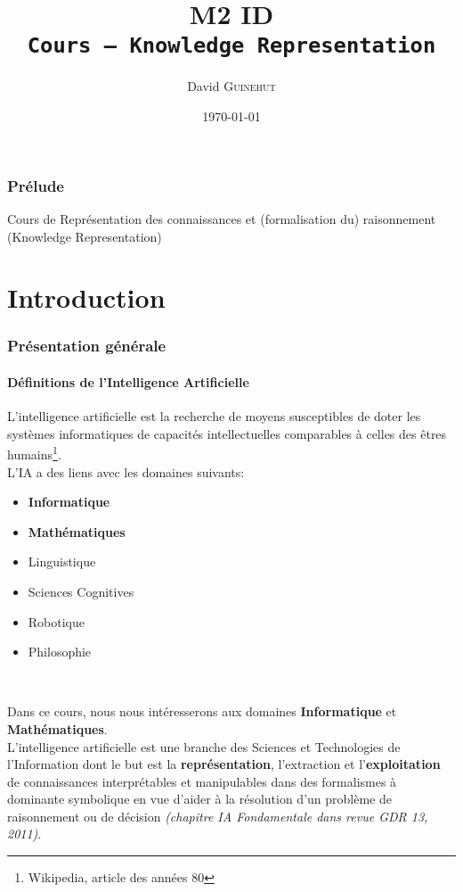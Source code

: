 \documentclass[a4paper,12pt]{article}
\title{M2 ID \\ \texttt{Cours -- Knowledge Representation}}
\author{David \textsc{Guinehut}}
\date{\today}
\begin{document}
	\renewcommand{\headrulewidth}{0.001pt}

	
	\pagestyle{fancy}
	
	\maketitle

	\tableofcontents

	\section*{Prélude}
	Cours de Représentation des connaissances et (formalisation du) raisonnement (Knowledge Representation)
	
	\part{Introduction}
	\section{Présentation générale}
	\subsection{Définitions de l'Intelligence Artificielle}
	L'intelligence artificielle  est la \og{}recherche de moyens susceptibles de doter les systèmes informatiques de capacités intellectuelles comparables à celles des êtres humains\fg{}\footnote{Wikipedia, article des années 80}.\\
	
	L'IA a des liens avec les domaines suivants:
	\begin{itemize}
		\item \textbf{Informatique}
		\item \textbf{Mathématiques}
		\item Linguistique
		\item Sciences Cognitives
		\item Robotique
		\item Philosophie
	\end{itemize}
	~
	
	Dans ce cours, nous nous intéresserons aux domaines \textbf{Informatique} et \textbf{Mathématiques}.\\
	
	L'intelligence artificielle est une branche des Sciences et Technologies de l'Information dont le but est la \textbf{représentation}, l'extraction et l'\textbf{exploitation} de connaissances interprétables et manipulables dans des formalismes à dominante symbolique en vue d'aider à la résolution d'un problème de raisonnement ou de décision \emph{(chapitre IA Fondamentale dans revue GDR 13, 2011)}.\\
	
\end{document}
